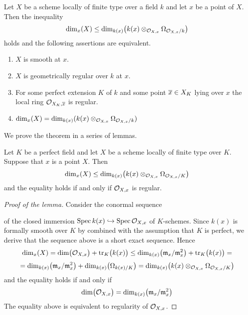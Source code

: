 \begin{theorem}\label{theorem:main_result_concerning_smoothness_over_a_field}
Let $X$ be a scheme locally of finite type over a field $k$ and let $x$ be a point of $X$. Then the inequality
$$\mathrm{dim}_x(X)\leq \mathrm{dim}_{k(x)}\big(k(x)\otimes_{{\mathcal O}_{X,x}}\Omega_{{\mathcal O}_{X,x}/k}\big)$$
holds and the following assertions are equivalent.
\begin{enumerate}[label=\emph{\textbf{(\roman*)}}, leftmargin=3.0em]
\item $X$ is smooth at $x$.
\item $X$ is geometrically regular over $k$ at $x$.
\item For some perfect extension $K$ of $k$ and some point $\overline{x}\in X_K$ lying over $x$ the local ring ${\mathcal O}_{X_K,\overline{x}}$ is regular.
\item $\mathrm{dim}_x(X) = \mathrm{dim}_{k(x)}(k(x)\otimes_{{\mathcal O}_{X,x}}\Omega_{{\mathcal O}_{X,x}/k})$ 
\end{enumerate}
\end{theorem}
\noindent
We prove the theorem in a series of lemmas.

\begin{lemma}\label{lemma:inequality_of_dimensions}
Let $K$ be a perfect field and let $X$ be a scheme locally of finite type over $K$. Suppose that $x$ is a point $X$. Then
$$\mathrm{dim}_x(X) \leq \mathrm{dim}_{k(x)}\big(k(x)\otimes_{{\mathcal O}_{X,x}}\Omega_{{\mathcal O}_{X,x}/K}\big)$$
and the equality holds if and only if ${\mathcal O}_{X,x}$ is regular.
\end{lemma}
\begin{proof}[Proof of the lemma]
Consider the conormal sequence
\begin{center}
\end{center}
of the closed immersion $\mathrm{Spec}\, k(x) \hookrightarrow \mathrm{Spec}\, {\mathcal O}_{X,x}$ of $K$-schemes. Since $k(x)$ is formally smooth over $K$ by {\cite[Corollary 6.4]{Formally_smooth_and_unramified}} combined with the assumption that $K$ is perfect, we derive that the sequence above is a short exact sequence. Hence
$$\mathrm{dim}_x(X) = \mathrm{dim}\big({\mathcal O}_{X,x}\big) + \mathrm{tr}_K\big(k(x)\big) \leq \mathrm{dim}_{k(x)}\big(\mathfrak{m}_x/\mathfrak{m}^2_x\big) + \mathrm{tr}_K\big(k(x)\big) =$$
$$= \mathrm{dim}_{k(x)}\big(\mathfrak{m}_x/\mathfrak{m}^2_x\big) + \mathrm{dim}_{k(x)}\big(\Omega_{k(x)/K}\big) = \mathrm{dim}_{k(x)}\big(k(x)\otimes_{{\mathcal O}_{X,x}}\Omega_{{\mathcal O}_{X,x}/K}\big)$$
and the equality holds if and only if
$$\mathrm{dim}\big({\mathcal O}_{X,x}\big) = \mathrm{dim}_{k(x)}\big(\mathfrak{m}_x/\mathfrak{m}^2_x\big)$$
The equality above is equivalent to regularity of ${\mathcal O}_{X,x}$.
\end{proof}

